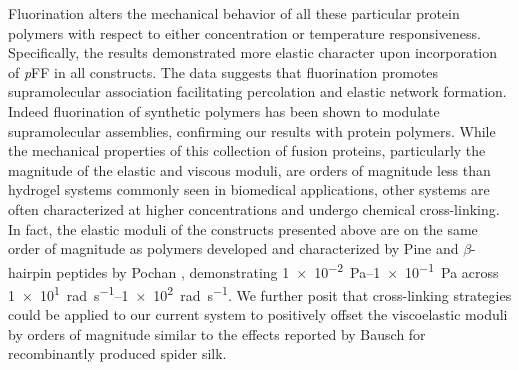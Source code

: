 \begin{refsection}
Fluorination alters the mechanical behavior of all these particular protein
polymers with respect to either concentration or temperature responsiveness.
Specifically, the results demonstrated more elastic character upon incorporation
of \emph{p}FF in all constructs. The data suggests that fluorination promotes
supramolecular association facilitating percolation and elastic network
formation.\cite{Veerman2006,Safran1985,VanderLinden2001} Indeed fluorination of
synthetic polymers has been shown to modulate supramolecular assemblies,
confirming our results with protein
polymers.\cite{Percec2005,Krafft1993,Krafft1994,Krafft2001} While the mechanical
properties of this collection of fusion proteins, particularly the magnitude of
the elastic and viscous moduli, are orders of magnitude less than hydrogel
systems commonly seen in biomedical applications, other systems are often
characterized at higher concentrations and undergo chemical
cross-linking.\cite{Krishna2010,Yan2010a,Rammensee2008,Breedveld2004,Schneider2002}
In fact, the elastic moduli of the constructs presented above are on the same
order of magnitude as 
polymers developed and characterized by Pine  and
${\beta}$-hairpin peptides by Pochan , demonstrating
\SIrange[scientific-notation=true,retain-unity-mantissa=false]{1e-2}{1e-1}{\pascal}
across
\SIrange[scientific-notation=true,retain-unity-mantissa=false]{1e1}{1e2}{\radian\per\s}.
\cite{Breedveld2004,Yucel2008} We further posit that cross-linking strategies
could be applied to our current system to positively offset the viscoelastic
moduli by orders of magnitude similar to the effects reported by Bausch
 for recombinantly produced spider
silk.\cite{Rammensee2008,Breedveld2004,Yucel2008}


\end{refsection}
